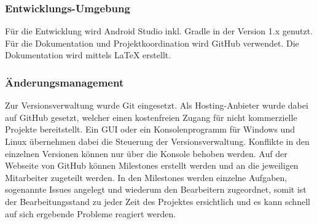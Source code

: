 \subsubsection{Entwicklungs-Umgebung}
Für die Entwicklung wird Android Studio inkl. Gradle in der Version 1.x genutzt. Für die Dokumentation und Projektkoordination wird GitHub verwendet.
Die Dokumentation wird mittels \LaTeX{} erstellt.



%
%
%
%
%



\subsubsection{Änderungsmanagement}
Zur Versionsverwaltung wurde Git eingesetzt. Als Hosting-Anbieter wurde dabei auf GitHub gesetzt, welcher einen kostenfreien Zugang für nicht kommerzielle Projekte bereitstellt. Ein \ac{GUI} oder ein Konsolenprogramm für Windows und Linux übernehmen dabei die Steuerung der Versionsverwaltung. Konflikte in den einzelnen Versionen können nur über die Konsole behoben werden. Auf der Webseite von GitHub können Milestones erstellt werden und an die jeweiligen Mitarbeiter zugeteilt werden. In den Milestones werden einzelne Aufgaben, sogenannte Issues angelegt und wiederum den Bearbeitern zugeordnet, somit ist der Bearbeitungsstand zu jeder Zeit des Projektes ersichtlich und es kann schnell auf sich ergebende Probleme reagiert werden.



